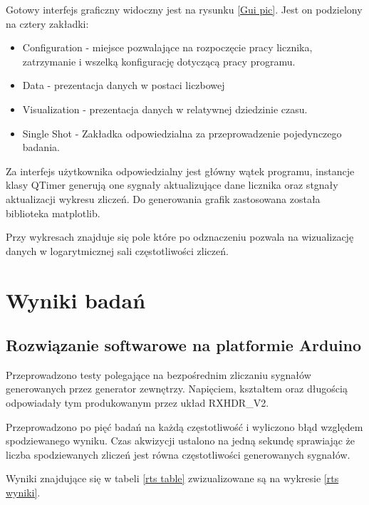 \documentclass[a4paper,12pt]{article}
\begin{document}
Gotowy interfejs graficzny widoczny jest na rysunku \ref{Gui pic}. Jest on podzielony na cztery zakładki:
\begin{itemize}
        \item Configuration - miejsce pozwalające na rozpoczęcie pracy licznika, zatrzymanie i wszelką konfigurację dotyczącą pracy programu. 
        \item Data - prezentacja danych w postaci liczbowej 
        \item Visualization - prezentacja danych w relatywnej dziedzinie czasu. 
        \item Single Shot - Zakładka odpowiedzialna za przeprowadzenie pojedynczego badania.
\end{itemize}

Za interfejs użytkownika odpowiedzialny jest główny wątek programu, instancje klasy QTimer\cite{doc pyqt} generują one sygnały aktualizujące dane licznika oraz stgnały aktualizacji wykresu zliczeń. 
Do generowania grafik zastosowana została biblioteka matplotlib\cite{doc matplotlib}. 

Przy wykresach znajduje się pole które po odznaczeniu pozwala na wizualizację danych w logarytmicznej sali częstotliwości zliczeń.

\newpage
\section{Wyniki badań}

\subsection{Rozwiązanie softwarowe na platformie Arduino}

Przeprowadzono testy polegające na bezpośrednim zliczaniu sygnałów generowanych przez generator zewnętrzy. 
Napięciem, kształtem oraz długością odpowiadały tym produkowanym przez układ RXHDR\_V2.

Przeprowadzono po pięć badań na każdą częstotliwość i wyliczono błąd względem spodziewanego wyniku. 
Czas akwizycji ustalono na jedną sekundę sprawiając że liczba spodziewanych zliczeń jest równa częstotliwości generowanych sygnałów.

Wyniki znajdujące się w tabeli \ref{rts table} zwizualizowane są na wykresie \ref{rts wyniki}.
\end{document}
